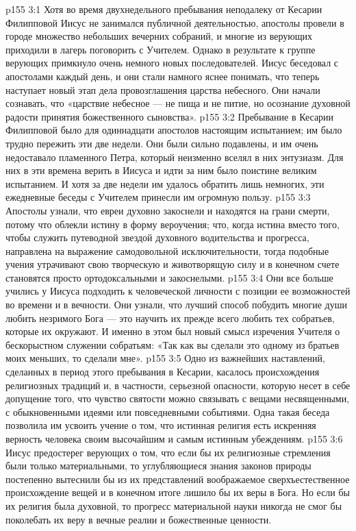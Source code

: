 \vs p155 3:1 Хотя во время двухнедельного пребывания неподалеку от Кесарии Филипповой Иисус не занимался публичной деятельностью, апостолы провели в городе множество небольших вечерних собраний, и многие из верующих приходили в лагерь поговорить с Учителем. Однако в результате к группе верующих примкнуло очень немного новых последователей. Иисус беседовал с апостолами каждый день, и они стали намного яснее понимать, что теперь наступает новый этап дела провозглашения царства небесного. Они начали сознавать, что «царствие небесное --- не пища и не питие, но осознание духовной радости принятия божественного сыновства».
\vs p155 3:2 Пребывание в Кесарии Филипповой было для одиннадцати апостолов настоящим испытанием; им было трудно пережить эти две недели. Они были сильно подавлены, и им очень недоставало пламенного Петра, который неизменно вселял в них энтузиазм. Для них в эти времена верить в Иисуса и идти за ним было поистине великим испытанием. И хотя за две недели им удалось обратить лишь немногих, эти ежедневные беседы с Учителем принесли им огромную пользу.
\vs p155 3:3 Апостолы узнали, что евреи духовно закоснели и находятся на грани смерти, потому что облекли истину в форму вероучения; что, когда истина вместо того, чтобы служить путеводной звездой духовного водительства и прогресса, направлена на выражение самодовольной исключительности, тогда подобные учения утрачивают свою творческую и животворящую силу и в конечном счете становятся просто ортодоксальными и закоснелыми.
\vs p155 3:4 Они все больше учились у Иисуса подходить к человеческой личности с позиции ее возможностей во времени и в вечности. Они узнали, что лучший способ побудить многие души любить незримого Бога --- это научить их прежде всего любить тех собратьев, которые их окружают. И именно в этом был новый смысл изречения Учителя о бескорыстном служении собратьям: «Так как вы сделали это одному из братьев моих меньших, то сделали мне».
\vs p155 3:5 Одно из важнейших наставлений, сделанных в период этого пребывания в Кесарии, касалось происхождения религиозных традиций и, в частности, серьезной опасности, которую несет в себе допущение того, что чувство святости можно связывать с вещами несвященными, с обыкновенными идеями или повседневными событиями. Одна такая беседа позволила им усвоить учение о том, что истинная религия есть искренняя верность человека своим высочайшим и самым истинным убеждениям.
\vs p155 3:6 Иисус предостерег верующих о том, что если бы их религиозные стремления были только материальными, то углубляющиеся знания законов природы постепенно вытеснили бы из их представлений воображаемое сверхъестественное происхождение вещей и в конечном итоге лишило бы их веры в Бога. Но если бы их религия была духовной, то прогресс материальной науки никогда не смог бы поколебать их веру в вечные реалии и божественные ценности.
